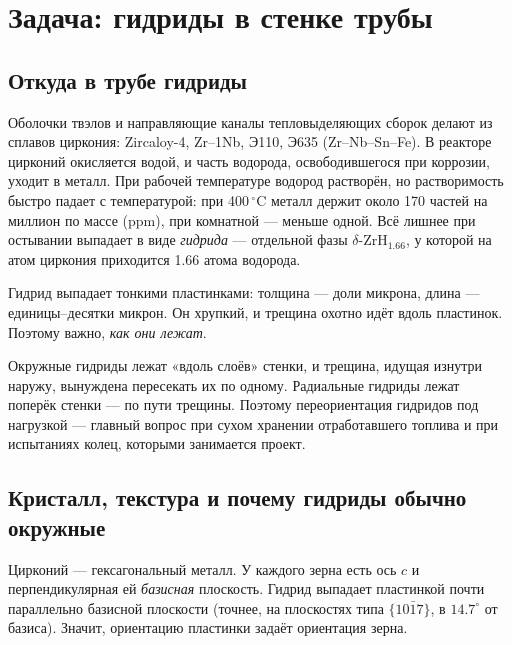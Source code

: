 \chapter{Задача: гидриды в стенке трубы}\label{ch:problem}

\section{Откуда в трубе гидриды}

Оболочки твэлов и направляющие каналы тепловыделяющих сборок делают из сплавов циркония:
Zircaloy-4, Zr--1Nb, Э110, Э635 (Zr--Nb--Sn--Fe). В реакторе цирконий окисляется водой, и часть
водорода, освободившегося при коррозии, уходит в металл. При рабочей температуре водород
растворён, но растворимость быстро падает с температурой: при 400\,$^\circ$C металл держит
около 170 частей на миллион по массе (ppm), при комнатной --- меньше одной. Всё лишнее при
остывании выпадает в виде \emph{гидрида} --- отдельной фазы $\delta$-ZrH$_{1.66}$, у которой
на атом циркония приходится 1.66 атома водорода.

Гидрид выпадает тонкими пластинками: толщина --- доли микрона, длина --- единицы--десятки
микрон. Он хрупкий, и трещина охотно идёт вдоль пластинок. Поэтому важно, \emph{как они лежат}.


\begin{idea}
Окружные гидриды лежат «вдоль слоёв» стенки, и трещина, идущая изнутри наружу, вынуждена
пересекать их по одному. Радиальные гидриды лежат поперёк стенки --- по пути трещины. Поэтому
переориентация гидридов под нагрузкой --- главный вопрос при сухом хранении отработавшего
топлива и при испытаниях колец, которыми занимается проект.
\end{idea}

\section{Кристалл, текстура и почему гидриды обычно окружные}

Цирконий --- гексагональный металл. У каждого зерна есть ось $c$ и перпендикулярная ей
\emph{базисная} плоскость. Гидрид выпадает пластинкой почти параллельно базисной плоскости
(точнее, на плоскостях типа $\{10\bar17\}$, в $14.7^\circ$ от базиса). Значит, ориентацию
пластинки задаёт ориентация зерна.


